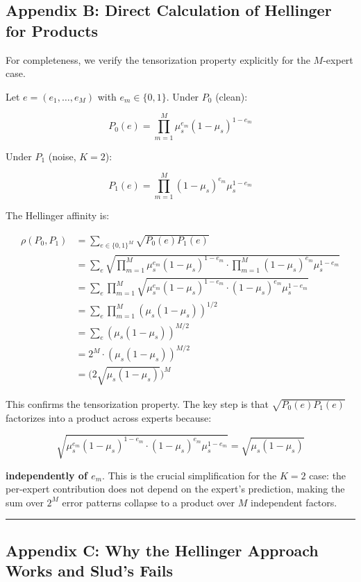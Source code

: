 \documentclass[
  12pt,
]{article}
\begin{document}
\subsection{Appendix B: Direct Calculation of Hellinger for
Products}\label{appendix-b-direct-calculation-of-hellinger-for-products}

For completeness, we verify the tensorization property explicitly for
the \(M\)-expert case.

Let \(e = (e_1, \dots, e_M)\) with \(e_m \in \{0,1\}\). Under \(P_0\)
(clean):

\[P_0(e) = \prod_{m=1}^M \mu_s^{e_m} (1-\mu_s)^{1-e_m}\]

Under \(P_1\) (noise, \(K=2\)):

\[P_1(e) = \prod_{m=1}^M (1-\mu_s)^{e_m} \mu_s^{1-e_m}\]

The Hellinger affinity is:

\[\begin{aligned}
\rho(P_0, P_1) &= \sum_{e \in \{0,1\}^M} \sqrt{P_0(e) P_1(e)} \\
&= \sum_{e} \sqrt{\prod_{m=1}^M \mu_s^{e_m}(1-\mu_s)^{1-e_m} \cdot \prod_{m=1}^M (1-\mu_s)^{e_m}\mu_s^{1-e_m}} \\
&= \sum_{e} \prod_{m=1}^M \sqrt{\mu_s^{e_m}(1-\mu_s)^{1-e_m} \cdot (1-\mu_s)^{e_m}\mu_s^{1-e_m}} \\
&= \sum_{e} \prod_{m=1}^M (\mu_s(1-\mu_s))^{1/2} \\
&= \sum_{e} (\mu_s(1-\mu_s))^{M/2} \\
&= 2^M \cdot (\mu_s(1-\mu_s))^{M/2} \\
&= \bigl(2\sqrt{\mu_s(1-\mu_s)}\bigr)^M
\end{aligned}\]

This confirms the tensorization property. The key step is that
\(\sqrt{P_0(e)P_1(e)}\) factorizes into a product across experts
because:

\[\sqrt{\mu_s^{e_m}(1-\mu_s)^{1-e_m} \cdot (1-\mu_s)^{e_m}\mu_s^{1-e_m}}
= \sqrt{\mu_s(1-\mu_s)}\]

\textbf{independently of \(e_m\)}. This is the crucial simplification
for the \(K=2\) case: the per-expert contribution does not depend on the
expert's prediction, making the sum over \(2^M\) error patterns collapse
to a product over \(M\) independent factors.

\begin{center}\rule{0.5\linewidth}{0.5pt}\end{center}

\subsection{Appendix C: Why the Hellinger Approach Works and Slud's
Fails}\label{appendix-c-why-the-hellinger-approach-works-and-sluds-fails}
\end{document}
